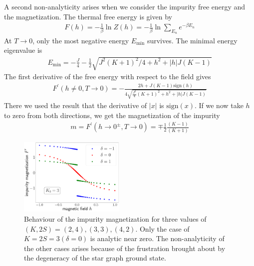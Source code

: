 \documentclass[reprint,prb,superscriptaddress]{revtex4-2}
\begin{document}
A second non-analyticity arises when we consider the impurity free energy and the magnetization. The thermal free energy is given by
\begin{equation}\begin{aligned}
	F(h) = -\frac{1}{\beta}\ln Z(h) = -\frac{1}{\beta}\ln\sum_{E_n}e^{-\beta E_n}
\end{aligned}\end{equation}
At \(T \to 0\), only the most negative energy \(E_\text{min}\) survives. The minimal energy eigenvalue is
\begin{equation}\begin{aligned}
	E_\text{min} = - \frac{J}{4} - \frac{1}{2}\sqrt{J^2(K+1)^2/4 + h^2 + |h|J(K-1)}
\end{aligned}\end{equation}
The first derivative of the free energy with respect to the field gives
\begin{equation}\begin{aligned}
	F^\prime(h\neq 0, T\to 0) =- \frac{2h + J(K-1)\text{sign}(h)}{4\sqrt{\frac{J^2}{4}(K+1)^2 + h^2 + |h|J(K-1)}}
\end{aligned}\end{equation}
There we used the result that the derivative of \(|x|\) is \(\text{sign}(x)\). If we now take \(h\) to zero from both directions, we get the magnetization of the impurity
\begin{equation}\begin{aligned}
	m = F^\prime(h \to 0^\pm, T\to 0) = \mp \frac{1}{2}\frac{(K-1)}{(K+1)}
\end{aligned}\end{equation}
\begin{figure}[!htpb]
	\centering
	\includegraphics[width=0.45\textwidth]{plt/disc_mag_imp_gen.pdf}
	\caption{Behaviour of the impurity magnetization for three values of \(\left(K, 2S\right) = \left(2, 4\right), \left( 3,3 \right), \left(4, 2\right)  \). Only the case of \(K=2S=3 \left(\delta=0\right)\) is analytic near zero. The non-analyticity of the other cases arises because of the frustration brought about by the degeneracy of the star graph ground state.}
	\label{mag_crit}
\end{figure}
\end{document}
